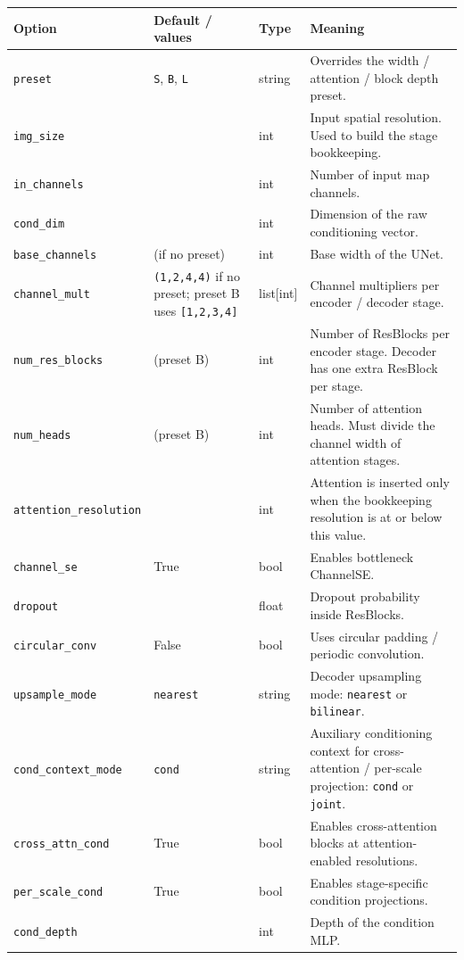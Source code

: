 \documentclass[11pt]{article}
\begin{document}
\begin{longtable}{>{\raggedright\arraybackslash}p{}
                  >{\raggedright\arraybackslash}p{}
                  >{\raggedright\arraybackslash}p{}
                  >{\raggedright\arraybackslash}p{}}
\toprule
\textbf{Option} & \textbf{Default / values} & \textbf{Type} & \textbf{Meaning} \\
\midrule
\endhead
\texttt{preset} & \texttt{S}, \texttt{B}, \texttt{L} & string & Overrides the width / attention / block depth preset. \\
\texttt{img\_size} & 256 & int & Input spatial resolution. Used to build the stage bookkeeping. \\
\texttt{in\_channels} & 3 & int & Number of input map channels. \\
\texttt{cond\_dim} & 6 & int & Dimension of the raw conditioning vector. \\
\texttt{base\_channels} & 128 (if no preset) & int & Base width of the UNet. \\
\texttt{channel\_mult} & \texttt{(1,2,4,4)} if no preset; preset B uses \texttt{[1,2,3,4]} & list[int] & Channel multipliers per encoder / decoder stage. \\
\texttt{num\_res\_blocks} & 2 (preset B) & int & Number of ResBlocks per encoder stage. Decoder has one extra ResBlock per stage. \\
\texttt{num\_heads} & 8 (preset B) & int & Number of attention heads. Must divide the channel width of attention stages. \\
\texttt{attention\_resolution} & 32 & int & Attention is inserted only when the bookkeeping resolution is at or below this value. \\
\texttt{channel\_se} & True & bool & Enables bottleneck ChannelSE. \\
\texttt{dropout} & 0.0 & float & Dropout probability inside ResBlocks. \\
\texttt{circular\_conv} & False & bool & Uses circular padding / periodic convolution. \\
\texttt{upsample\_mode} & \texttt{nearest} & string & Decoder upsampling mode: \texttt{nearest} or \texttt{bilinear}. \\
\texttt{cond\_context\_mode} & \texttt{cond} & string & Auxiliary conditioning context for cross-attention / per-scale projection: \texttt{cond} or \texttt{joint}. \\
\texttt{cross\_attn\_cond} & True & bool & Enables cross-attention blocks at attention-enabled resolutions. \\
\texttt{per\_scale\_cond} & True & bool & Enables stage-specific condition projections. \\
\texttt{cond\_depth} & 4 & int & Depth of the condition MLP. \\
\bottomrule
\end{longtable}
\end{document}
